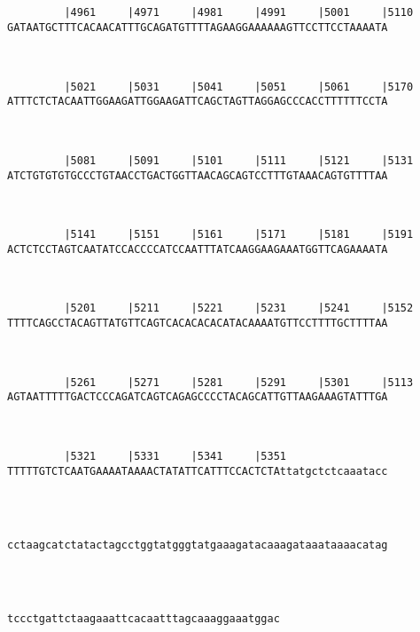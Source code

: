 \documentclass{article}
\begin{document}
\begin{Verbatim}
                                                            
   
         |4961     |4971     |4981     |4991     |5001     |5110
GATAATGCTTTCACAACATTTGCAGATGTTTTAGAAGGAAAAAAGTTCCTTCCTAAAATA
                                                            
                                                            
   
         |5021     |5031     |5041     |5051     |5061     |5170
ATTTCTCTACAATTGGAAGATTGGAAGATTCAGCTAGTTAGGAGCCCACCTTTTTTCCTA
                                                            
                                                            
   
         |5081     |5091     |5101     |5111     |5121     |5131
ATCTGTGTGTGCCCTGTAACCTGACTGGTTAACAGCAGTCCTTTGTAAACAGTGTTTTAA
                                                            
                                                            
   
         |5141     |5151     |5161     |5171     |5181     |5191
ACTCTCCTAGTCAATATCCACCCCATCCAATTTATCAAGGAAGAAATGGTTCAGAAAATA
                                                            
                                                            
   
         |5201     |5211     |5221     |5231     |5241     |5152
TTTTCAGCCTACAGTTATGTTCAGTCACACACACATACAAAATGTTCCTTTTGCTTTTAA
                                                            
                                                            
   
         |5261     |5271     |5281     |5291     |5301     |5113
AGTAATTTTTGACTCCCAGATCAGTCAGAGCCCCTACAGCATTGTTAAGAAAGTATTTGA
                                                            
                                                            
   
         |5321     |5331     |5341     |5351                
TTTTTGTCTCAATGAAAATAAAACTATATTCATTTCCACTCTAttatgctctcaaatacc
                                                            
                                                            
   
                                                            
cctaagcatctatactagcctggtatgggtatgaaagatacaaagataaataaaacatag
                                                            
                                                            
   
                                           
tccctgattctaagaaattcacaatttagcaaaggaaatggac
                                           
                                           
  
\end{Verbatim}
\end{document}

